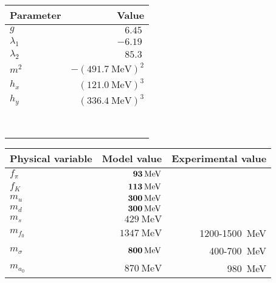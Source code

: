 \begin{table}
\centering
\begin{tabular}{ l r }
	\toprule
	Parameter   & Value                                 \\
	\midrule
	$g$         & $\SI{6.45}{}$                         \\
	$\lambda_1$ & $-\SI{6.19}{}$                        \\
	$\lambda_2$ & $ \SI{85.3}{}$                        \\
	$m^2$       & $-(\SI{491.7}{\mega\electronvolt})^2$ \\
	$h_x$       & $(\SI{121.0}{\mega\electronvolt})^3$  \\
	$h_y$       & $(\SI{336.4}{\mega\electronvolt})^3$  \\
	\\
	\\
	\\
	\\
	\\
	\\
	\\
	\\
	\bottomrule
\end{tabular}
\hfill
\begin{tabular}{ l r r }
	\toprule
	Physical variable & Model value                             & Experimental value                      \\
	\midrule
	$f_\pi$           & $\textbf{\SI{93}{\mega\electronvolt}}$  & \TODO{?}                                         \\
	$f_K$             & $\textbf{\SI{113}{\mega\electronvolt}}$ & \TODO{?}                                         \\
	\midrule
	$m_u$             & $\textbf{\SI{300}{\mega\electronvolt}}$ & \TODO{?}                                         \\
	$m_d$             & $\textbf{\SI{300}{\mega\electronvolt}}$ & \TODO{?}                                         \\
	$m_s$             & $\SI{429}{\mega\electronvolt}$          & \TODO{?}                                         \\
	\midrule
	$m_{f_0}$         & $\SI{1347}{\mega\electronvolt}$         & \SI{1200}{}-\SI{1500}{\mega\electronvolt}        \\
	$m_\sigma$        & $\textbf{\SI{800}{\mega\electronvolt}}$ & \SI{400}{}-\SI{700}{\mega\electronvolt}          \\
	$m_{a_0}$         & $\SI{870}{\mega\electronvolt}$          & \SI{980}{\mega\electronvolt}                     \\

\end{tabular}
\end{table}
